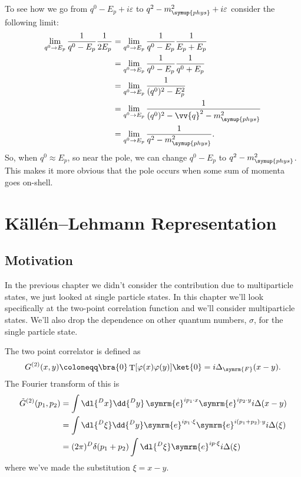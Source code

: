 \documentclass[fleqn]{NotesClass}
\newcommand{\e}{\symrm{e}}
\DeclareMathOperator{\timeOrdering}{T}
\newcommand{\feynman}{\symrm{F}}
\newcommand{\phys}{\symup{phys}}
\begin{document}
    To see how we go from \(q^0 - E_p + i\varepsilon\) to \(q^2 - m_{\phys}^2 + i\varepsilon\) consider the following limit:
    \begin{align}
        \lim_{q^0 \to E_p} \frac{1}{q^0 - E_p} \frac{1}{2E_p} &= \lim_{q^0 \to E_p} \frac{1}{q^0 - E_p} \frac{1}{E_p + E_p}\\
        &= \lim_{q^0 \to E_p} \frac{1}{q^0 - E_p} \frac{1}{q^0 + E_p}\\
        &= \lim_{q^0 \to E_p} \frac{1}{(q^0)^2 - E_p^2}\\
        &= \lim_{q^0 \to E_p} \frac{1}{(q^0)^2 - \vv{q}^2 - m_{\phys}^2}\\
        &= \lim_{q^0 \to E_p} \frac{1}{q^2 - m_{\phys}^2}.
    \end{align}
    So, when \(q^0 \approx E_p\), so near the pole, we can change \(q^0 - E_p\) to \(q^2 - m_{\phys}^2\).
    This makes it more obvious that the pole occurs when some sum of momenta goes on-shell.
    
    \chapter{K\"all\'en--Lehmann Representation}
    \section{Motivation}
    In the previous chapter we didn't consider the contribution due to multiparticle states, we just looked at single particle states.
    In this chapter we'll look specifically at the two-point correlation function and we'll consider multiparticle states.
    We'll also drop the dependence on other quantum numbers, \(\sigma\), for the single particle state.
    
    The two point correlator is defined as
    \begin{equation}
        G^{(2)}(x, y) \coloneqq \bra{0} \timeOrdering[\varphi(x)\varphi(y)] \ket{0} = i\Delta_{\feynman}(x - y).
    \end{equation}
    The Fourier transform of this is
    \begin{align}
        \tilde{G}^{(2)}(p_1, p_2) &= \int \dl{^Dx}\dd{^Dy} \, \e^{ip_1 \cdot x} \e^{ip_2 \cdot y} i\Delta(x - y)\\
        &= \int \dl{^D\xi} \dd{^Dy} \e^{ip_1 \cdot \xi} \e^{i(p_1 + p_2) \cdot y} i\Delta(\xi)\\
        &= (2\pi)^D \delta(p_1 + p_2) \int \dl{^D\xi} \e^{ip\cdot \xi} i\Delta(\xi)
    \end{align}
    where we've made the substitution \(\xi = x - y\).
    
\end{document}
